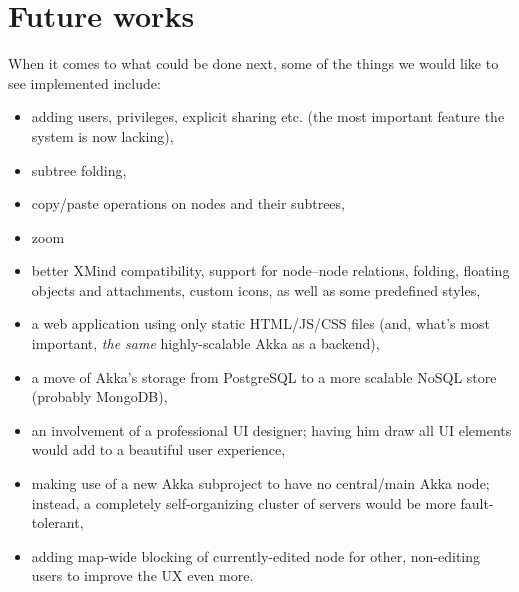 \section{Future works}
\label{sec:summary-future}
When it comes to what could be done next, some of the things we would like to see implemented include:

\begin{itemize}
	\item adding users, privileges, explicit sharing etc. (the most important feature the system is now lacking),
	\item subtree folding,
	\item copy/paste operations on nodes and their subtrees,
	\item zoom 
	\item better XMind compatibility, support for node--node relations, folding, floating objects and attachments, custom icons, as well as some predefined styles,
	\item a web application using only static HTML/JS/CSS files (and, what's most important, \emph{the same} highly-scalable Akka as a backend),
	\item a move of Akka's storage from PostgreSQL to a more scalable NoSQL store (probably MongoDB),
	\item an involvement of a professional UI designer; having him draw all UI elements would add to a beautiful user experience,
	\item making use of a new  Akka subproject to have no central/main Akka node; instead, a completely self-organizing cluster of servers would be more fault-tolerant,
	\item adding map-wide blocking of currently-edited node for other, non-editing users to improve the UX even more.
\end{itemize}
